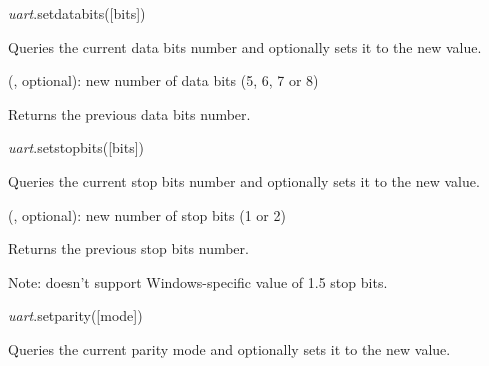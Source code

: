 \documentclass[a4paper,12pt,twoside,extrafontsizes]{memoir}
\begin{document}

\begin{luafuncprototype}
\emph{uart}.setdatabits([bits])
\end{luafuncprototype}

\begin{funcdescr}
	Queries the current data bits number and optionally sets it to the new value.
\end{funcdescr}

\begin{funcparams}
	 (, optional): new number of data bits (5, 6, 7 or 8)
\end{funcparams}

\begin{funcret}
	Returns the previous data bits number.
\end{funcret}


\begin{luafuncprototype}
\emph{uart}.setstopbits([bits])
\end{luafuncprototype}

\begin{funcdescr}
	Queries the current stop bits number and optionally sets it to the new value.
\end{funcdescr}

\begin{funcparams}
	 (, optional): new number of stop bits (1 or 2)
\end{funcparams}

\begin{funcret}
	Returns the previous stop bits number.
\end{funcret}

\begin{funcremarks}
	Note:  doesn't support Windows-specific value of 1.5 stop bits.
\end{funcremarks}


\begin{luafuncprototype}
\emph{uart}.setparity([mode])
\end{luafuncprototype}

\begin{funcdescr}
	Queries the current parity mode and optionally sets it to the new value.
\end{funcdescr}
\end{document}
